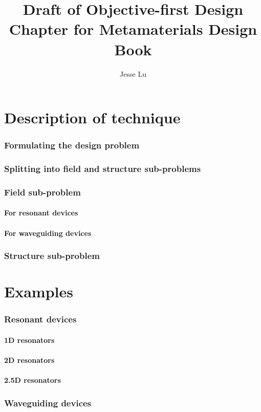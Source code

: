 \documentclass{svmono}
\title{Draft of Objective-first Design Chapter for Metamaterials Design Book}
\author{Jesse Lu}
\begin{document}
\maketitle
\tableofcontents
\part{Description of technique}
\section{Formulating the design problem}
\section{Splitting into field and structure sub-problems}
\section{Field sub-problem}
\subsection{For resonant devices}
\subsection{For waveguiding devices}

\section{Structure sub-problem}


\part{Examples}
\section{Resonant devices}
\subsection{1D resonators}
\subsection{2D resonators}
\subsection{2.5D resonators}
\section{Waveguiding devices}
\end{document}

